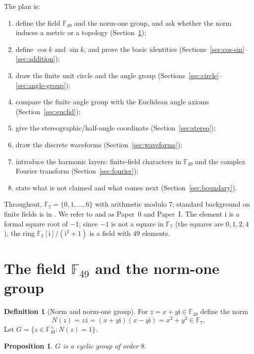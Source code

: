 \documentclass[11pt]{article}
\newtheorem{proposition}[theorem]{Proposition}
\theoremstyle{definition}
\newtheorem{definition}[theorem]{Definition}
\theoremstyle{remark}
\newcommand{\F}{\mathbb{F}}
\newcommand{\ii}{\mathrm{i}}
\newcommand{\Norm}{N}
\begin{document}
The plan is:
\begin{enumerate}
  \item define the field $\F_{49}$ and the norm-one group, and ask whether the norm induces a metric or a topology (Section~\ref{sec:field});
  \item define $\cos k$ and $\sin k$, and prove the basic identities
        (Sections~\ref{sec:cos-sin}--\ref{sec:addition});
  \item draw the finite unit circle and the angle group
        (Sections~\ref{sec:circle}--\ref{sec:angle-group});
  \item compare the finite angle group with the Euclidean angle axioms
        (Section~\ref{sec:euclid});
  \item give the stereographic/half-angle coordinate (Section~\ref{sec:stereo});
  \item draw the discrete waveforms (Section~\ref{sec:waveforms});
  \item introduce the harmonic layers: finite-field characters in $\F_{49}$ and
        the complex Fourier transform (Section~\ref{sec:fourier});
  \item state what is not claimed and what comes next (Section~\ref{sec:boundary}).
\end{enumerate}

Throughout, $\F_7=\{0,1,\dots,6\}$ with arithmetic modulo $7$; standard
background on finite fields is in \cite{Lidl}.  We refer to \cite{Paper0} and
\cite{Paper1} as Paper~0 and Paper~I.  The element
$\ii$ is a formal square root of $-1$; since $-1$ is not a square in $\F_7$
(the squares are $0,1,2,4$), the ring $\F_7[\ii]/(\ii^2+1)$ is a field with
$49$ elements.

\section{The field \texorpdfstring{$\F_{49}$}{F49} and the norm-one group}
\label{sec:field}

\begin{definition}[Norm and norm-one group]
For $z=x+y\ii\in\F_{49}$ define the norm
\[
  \Norm(z)=z\bar z=(x+y\ii)(x-y\ii)=x^2+y^2\in\F_7 .
\]
Let $G=\{z\in\F_{49}^\times:\Norm(z)=1\}$.
\end{definition}

\begin{proposition}\label{prop:group}
$G$ is a cyclic group of order $8$.
\end{proposition}
\end{document}
